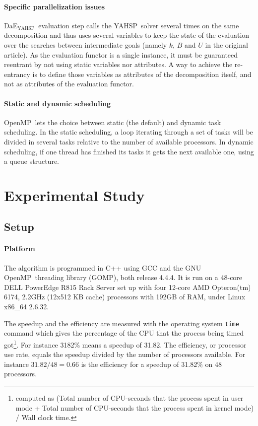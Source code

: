\documentclass{sig-alternate}
\newcommand{\DAEYAHSP}{{\sc DaE$_{\text{YAHSP}}$}}
\newcommand{\YAHSP}{{\sc YAHSP}}
\newcommand{\OPENMP}{{\sc OpenMP}}
\begin{document}
\paragraph{Specific parallelization issues}
\DAEYAHSP\ evaluation step calls the \YAHSP\ solver several times on the same
decomposition and thus uses several variables to keep the state of the
evaluation over the searches between intermediate goals (namely $k$, $B$ and $U$
in the original article). As the evaluation functor is a single instance, it
must be guaranteed reentrant by not using static variables nor attributes. A way
to achieve the re-entrancy is to define those variables as attributes of the
decomposition itself, and not as attributes of the evaluation functor.

\paragraph{Static and dynamic scheduling}
\OPENMP\ lets the choice between static (the default) and dynamic task
scheduling. In the static scheduling, a loop iterating through a set of
tasks will be divided in several tasks relative to the number of available
processors. In dynamic scheduling, if one thread has finished its tasks
it gets the next available one, using a queue structure.

\section{Experimental Study}

\subsection{Setup}

\paragraph{Platform}
The algorithm is programmed in C++ using GCC and the GNU \OPENMP\ threading
library (GOMP), both release 4.4.4. It is run on a 48-core DELL PowerEdge R815
Rack Server set up with four 12-core AMD Opteron(tm) 6174, 2.2GHz (12x512 KB
cache) processors with 192GB of RAM, under Linux x86\_64 2.6.32.

The speedup and the efficiency are measured with the operating system {\tt time} command which gives the percentage of the CPU that the process being timed got\footnote{computed as (Total number of CPU-seconds that the process spent in user mode + Total number of CPU-seconds that the process spent in kernel mode) / Wall clock time.}.
For instance 3182\% means a speedup of 31.82.
The efficiency, or processor use rate, equals the speedup divided by the number of processors available.
For instance $31.82/48 = 0.66$ is the efficiency for a speedup of 31.82\% on 48 processors.
\end{document}
